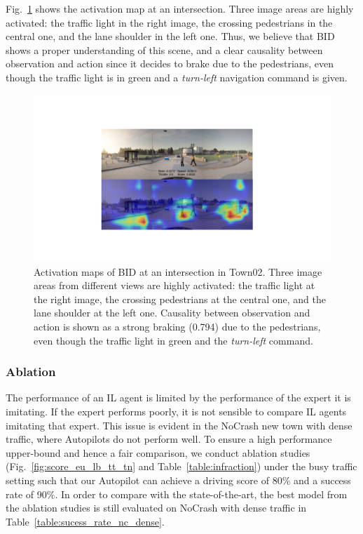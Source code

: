 Fig.~\ref{fig:attention_ped_greed} shows the activation map at an intersection. 
Three image areas are highly activated: the traffic light in the right image, the crossing pedestrians in the central one, and the lane shoulder in the left one. 
Thus, we believe that BID shows a proper understanding of this scene, and a clear causality between observation and action since it decides to brake due to the pedestrians, even though the traffic light is in green and a \emph{turn-left} navigation command is given.


\begin{figure}[ht!]
	\centering
	\includegraphics[width=\linewidth]{fig/attention_ped_greed.pdf}
	\caption{Activation maps of BID at an intersection in Town02. 
		Three image areas from different views are highly activated: 
		the traffic light at the right image, the crossing pedestrians at the central one, and the lane shoulder at the left one. 
		Causality between observation and action is shown as a strong braking (0.794) due to the pedestrians, even though the traffic light in green and the \emph{turn-left} command.}
	\label{fig:attention_ped_greed}
\end{figure}



\subsubsection{Ablation}

\hspace{1pc}The performance of an IL agent is limited by the performance of the expert it is imitating.
If the expert performs poorly, it is not sensible to compare IL agents imitating that expert.
This issue is evident in the NoCrash new town with dense traffic, where Autopilots do not perform well. 
To ensure a high performance upper-bound and hence a fair comparison, we conduct ablation studies (Fig.~\ref{fig:score_eu_lb_tt_tn} and Table~\ref{table:infraction}) under the busy traffic setting such that our Autopilot can achieve a driving score of 80\% and a success rate of 90\%. 
In order to compare with the state-of-the-art, the best model from the ablation studies is still evaluated on NoCrash with dense traffic in Table~\ref{table:sucess_rate_nc_dense}.


